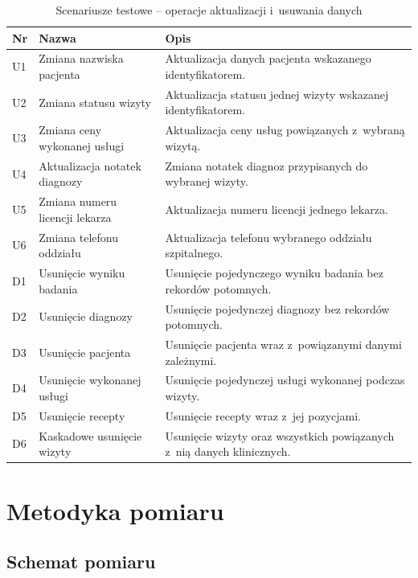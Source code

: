 \documentclass[12pt,a4paper]{article}
\begin{document}
\begin{table}[H]
\centering
\caption{Scenariusze testowe -- operacje aktualizacji i~usuwania danych}
\small
\begin{tabular}{@{}p{0.7cm}p{4cm}p{8.2cm}@{}}
\toprule
\textbf{Nr} & \textbf{Nazwa} & \textbf{Opis} \\
\midrule
U1 & Zmiana nazwiska pacjenta & Aktualizacja danych pacjenta wskazanego identyfikatorem. \\
U2 & Zmiana statusu wizyty & Aktualizacja statusu jednej wizyty wskazanej identyfikatorem. \\
U3 & Zmiana ceny wykonanej usługi & Aktualizacja ceny usług powiązanych z~wybraną wizytą. \\
U4 & Aktualizacja notatek diagnozy & Zmiana notatek diagnoz przypisanych do wybranej wizyty. \\
U5 & Zmiana numeru licencji lekarza & Aktualizacja numeru licencji jednego lekarza. \\
U6 & Zmiana telefonu oddziału & Aktualizacja telefonu wybranego oddziału szpitalnego. \\
\midrule
D1 & Usunięcie wyniku badania & Usunięcie pojedynczego wyniku badania bez rekordów potomnych. \\
D2 & Usunięcie diagnozy & Usunięcie pojedynczej diagnozy bez rekordów potomnych. \\
D3 & Usunięcie pacjenta & Usunięcie pacjenta wraz z~powiązanymi danymi zależnymi. \\
D4 & Usunięcie wykonanej usługi & Usunięcie pojedynczej usługi wykonanej podczas wizyty. \\
D5 & Usunięcie recepty & Usunięcie recepty wraz z~jej pozycjami. \\
D6 & Kaskadowe usunięcie wizyty & Usunięcie wizyty oraz wszystkich powiązanych z~nią danych klinicznych. \\
\bottomrule
\end{tabular}
\end{table}


\section{Metodyka pomiaru}
\label{sec:method}

\subsection{Schemat pomiaru}
\end{document}
